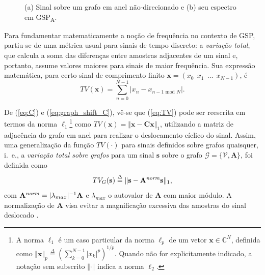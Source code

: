 \begin{figure}
\begin{minipage}[c]{0.27\linewidth}
{	}
\end{minipage}%
\caption{(a) Sinal sobre um grafo em anel n\~ao-direcionado e (b) seu espectro em GSP\textsubscript{A}.}%
\label{fig:diff_struct_GSPA}%
\end{figure}

Para fundamentar matematicamente a no\c c\~ao de frequ\^encia no contexto de GSP, partiu-se de uma m\'etrica usual para sinais de tempo discreto: a \emph{varia\c c\~ao total}, que calcula a soma das diferen\c cas entre amostras adjacentes de um sinal e, portanto, assume valores maiores para sinais de maior frequ\^encia. Sua express\~ao matem\'atica, para certo sinal de comprimento finito $ \mathbf{x} = (x_0 \ \ x_1 \ \ \dots \ \ x_{N-1}) $, \'e
\begin{equation}
\label{eq:TV}
TV(\mathbf{x}) = \sum_{n=0}^{N-1} | x_n - x_{n-1 \text{ mod } N}|.
\end{equation}

De (\ref{eq:C}) e (\ref{eq:graph_shift_C}), v\^e-se que (\ref{eq:TV}) pode ser reescrita em termos da norma $ \ell_1 $\footnote{A norma $ \ell_1 $ \'e um caso particular da norma $ \ell_p $ de um vetor $ \mathbf{x} \in \mathbb{C}^{N} $, definida como $ \Vert \mathbf{x}\Vert_p \overset{\Delta}{=} \left(\sum_{k=0}^{N-1} |x_k|^p\right)^{1/p} $. Quando n\~ao for explicitamente indicado, a nota\c c\~ao sem subscrito $ \Vert \cdot \Vert $ indica a norma $ \ell_2 $.} como $ TV(\mathbf{x}) = \Vert \mathbf{x} - \mathbf{C x}\Vert_1 $, utilizando a matriz de adjac\^encia do grafo em anel para realizar o deslocamento c\'iclico do sinal. Assim, uma generaliza\c{c}\~ao da fun\c c\~ao $ TV(\cdot) $ para sinais definidos sobre grafos quaisquer, i.~e., a \emph{varia\c c\~ao total sobre grafos} para um sinal $ \mathbf{s} $ sobre o grafo $ \mathcal{G} = \{\mathcal{V}, \mathbf{A}\} $, foi definida como
\begin{equation}
\label{eq:var_total}
TV_G(\mathbf{s}) \overset{\Delta}{=} \Vert \mathbf{s} - \mathbf{A}^{\text{\emph{norm}}} \mathbf{s}\Vert_1,
\end{equation}
com $ \mathbf{A}^{\text{\emph{norm}}} = |\lambda_{max}|^{-1}\mathbf{A} $ e $ \lambda_{max} $ o autovalor de $ \mathbf{A} $ com maior m\'odulo. A normaliza\c c\~ao de $ \mathbf{A} $ visa evitar a magnifica\c c\~ao excessiva das amostras do sinal deslocado \cite{sandryhaila2014frequency}.

